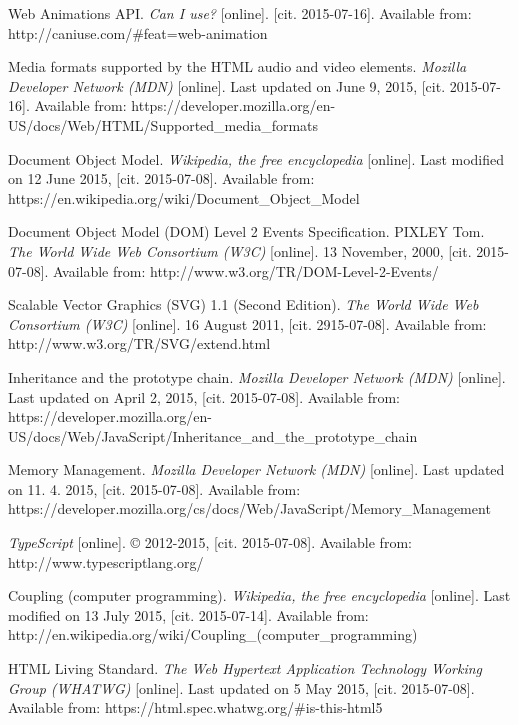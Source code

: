 \begin{thebibliography}{99}
Web Animations API. \emph{Can I use?} [online]. [cit. 2015-07-16]. Available from: http://caniuse.com/\#feat=web-animation

Media formats supported by the HTML audio and video elements. \emph{Mozilla Developer Network (MDN)} [online]. Last updated on June 9, 2015, [cit. 2015-07-16]. Available from: https://developer.mozilla.org/en-US/docs/Web/HTML/Supported\_media\_formats

Document Object Model. \emph{Wikipedia, the free encyclopedia} [online]. Last modified on 12 June 2015, [cit. 2015-07-08]. Available from: https://en.wikipedia.org/wiki/Document\_Object\_Model

Document Object Model (DOM) Level 2 Events Specification. PIXLEY Tom. \emph{The World Wide Web Consortium (W3C)} [online]. 13 November, 2000, [cit. 2015-07-08]. Available from: http://www.w3.org/TR/DOM-Level-2-Events/


Scalable Vector Graphics (SVG) 1.1 (Second Edition). \emph{The World Wide Web Consortium (W3C)} [online]. 16 August 2011, [cit. 2915-07-08]. Available from: http://www.w3.org/TR/SVG/extend.html



Inheritance and the prototype chain. \emph{Mozilla Developer Network (MDN)} [online]. Last updated on April 2, 2015, [cit. 2015-07-08]. Available from: https://developer.mozilla.org/en-US/docs/Web/JavaScript/Inheritance\_and\_the\_prototype\_chain

Memory Management. \emph{Mozilla Developer Network (MDN)} [online]. Last updated on 11. 4. 2015, [cit. 2015-07-08]. Available from: https://developer.mozilla.org/cs/docs/Web/JavaScript/Memory\_Management

\emph{TypeScript} [online]. © 2012-2015, [cit. 2015-07-08]. Available from: http://www.typescriptlang.org/


Coupling (computer programming). \emph{Wikipedia, the free encyclopedia} [online].  Last modified on 13 July 2015, [cit. 2015-07-14]. Available from: http://en.wikipedia.org/wiki/Coupling\_(computer\_programming)

HTML Living Standard. \emph{The Web Hypertext Application Technology Working Group (WHATWG)} [online]. Last updated on 5 May 2015, [cit. 2015-07-08]. Available from: https://html.spec.whatwg.org/\#is-this-html5


\end{thebibliography}
